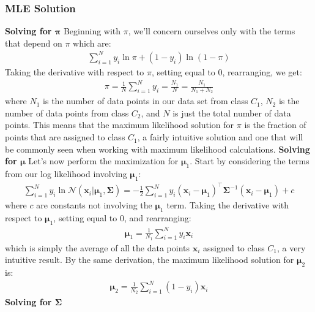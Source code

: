 \subsubsection{MLE Solution}

\textbf{Solving for $\boldsymbol{\pi}$} \newline
Beginning with $\pi$, we'll concern ourselves only with the terms that depend on $\pi$ which are:
\begin{align*}
	\sum_{i=1}^{N} y_{i}\ln{\pi} + (1-y_{i})\ln{(1 - \pi)}
\end{align*}
Taking the derivative with respect to $\pi$, setting equal to 0, rearranging, we get:
\begin{align*}
	\pi = \frac{1}{N} \sum_{i=1}^{N} y_{i} = \frac{N_{1}}{N} = \frac{N_{1}}{N_{1} + N_{2}}
\end{align*}
where $N_{1}$ is the number of data points in our data set from class $C_{1}$, $N_{2}$ is the number of data points from class $C_{2}$, and $N$ is just the total number of data points. This means that the maximum likelihood solution for $\pi$ is the fraction of points that are assigned to class $C_{1}$, a fairly intuitive solution and one that will be commonly seen when working with maximum likelihood calculations. \newline \newline
\textbf{Solving for $\boldsymbol{\mu}$} \newline
Let's now perform the maximization for $\boldsymbol{\mu}_{1}$. Start by considering the terms from our log likelihood involving $\boldsymbol{\mu}_{1}$:
\begin{align*}
	\sum_{i=1}^{N} y_{i} \ln \mathcal{N}(\textbf{x}_{i} | \boldsymbol{\mu}_{1}, \boldsymbol{\Sigma}) = -\frac{1}{2} \sum_{i=1}^{N} y_{i} (\textbf{x}_{i} - \boldsymbol{\mu}_{1})^\top\boldsymbol{\Sigma}^{-1}(\textbf{x}_{i} - \boldsymbol{\mu}_{1}) + c
\end{align*}
where $c$ are constants not involving the $\boldsymbol{\mu}_{1}$ term. Taking the derivative with respect to $\boldsymbol{\mu}_{1}$, setting equal to 0, and rearranging:
\begin{align*}
	\boldsymbol{\mu}_{1} = \frac{1}{N_{1}} \sum_{i=1}^{N} y_{i}\textbf{x}_{i}
\end{align*}
which is simply the average of all the data points $\textbf{x}_{i}$ assigned to class $C_{1}$, a very intuitive result. By the same derivation, the maximum likelihood solution for $\boldsymbol{\mu}_{2}$ is:
\begin{align*}
	\boldsymbol{\mu}_{2} = \frac{1}{N_{2}} \sum_{i=1}^{N} (1-y_{i})\textbf{x}_{i}
\end{align*}
\textbf{Solving for $\boldsymbol{\Sigma}$} \newline

